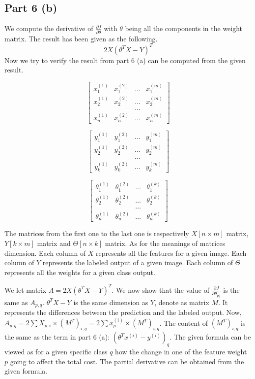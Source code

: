 \documentclass{article}
\begin{document}
\begin{part6}
\subsection{Part 6 (b)}

We compute the derivative of $\frac{\partial J}{\partial \theta}$ with $\theta$ being all the components in the weight matrix. The result has been given as the following. $$2 X (\theta^T X-Y)^T $$ Now we try to verify the result from part 6 (a) can be computed from the given result.


\[
\begin{bmatrix}
x_1^{(1)} & x_1^{(2)} & \dots & x_1^{(m)} \\
x_2^{(1)} & x_2^{(2)} & \dots & x_2^{(m)} \\
& &\dots             \\
x_n^{(1)} & x_n^{(2)} & \dots & x_n^{(m)}
\end{bmatrix}
\]

\[
\begin{bmatrix}
y_1^{(1)} & y_1^{(2)} & \dots & y_1^{(m)} \\
y_2^{(1)} & y_2^{(2)} & \dots & y_2^{(m)} \\
& &\dots             \\
y_k^{(1)} & y_k^{(2)} & \dots & y_k^{(m)}
\end{bmatrix}
\]


\[
\begin{bmatrix}
\theta_1^{(1)} & \theta_1^{(2)} & \dots & \theta_1^{(k)} \\
\theta_2^{(1)} & \theta_2^{(2)} & \dots & \theta_2^{(k)} \\
& &\dots             \\
\theta_n^{(1)} & \theta_n^{(2)} & \dots & \theta_n^{(k)}
\end{bmatrix}
\]


\newpage
The matrices from the first one to the last one is respectively $X [n \times m] $ matrix, $Y [k \times m] $ matrix and $\Theta [n \times k] $ matrix. As for the meanings of matrices dimension. Each column of $X$ represents all the features for a given image. Each column of $Y$ represents the labeled output of a given image. Each column of $\Theta$ represents all the weights for a given class output.

\vspace{5mm}

We let matrix $A = 2 X (\theta^T X-Y)^T $. We now show that the value of $ \frac{\partial J}{\partial \theta_{pq}} $ is the same as $A_{p,q}$. $\theta^T X-Y$ is the same dimension as $Y$, denote as matrix $M$. It represents the differences between the prediction and the labeled output. Now, $A_{p,q} = 2\sum X_{p, i} \times (M^T)_{i, q} = 2 \sum x^{(i)}_p \times (M^T)_{i, q}$. The content of $(M^T)_{i, q}$ is the same as the term in part 6 (a): $ (\theta^T x^{(i)}-y^{(i)})_q $. The given formula can be viewed as for a given specific class $q$ how the change in one of the feature weight $p$ going to affect the total cost. The partial derivative can be obtained from the given formula.


\end{part6}
\end{document}
